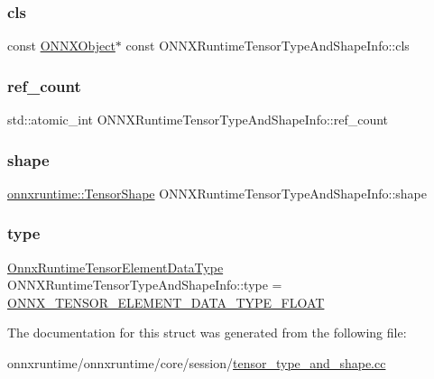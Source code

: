 \subsubsection{\texorpdfstring{cls}{cls}}
{\footnotesize\ttfamily const \mbox{\hyperlink{structONNXObject}{O\+N\+N\+X\+Object}}$\ast$ const O\+N\+N\+X\+Runtime\+Tensor\+Type\+And\+Shape\+Info\+::cls}

\mbox{\label{structONNXRuntimeTensorTypeAndShapeInfo_a365e7d1b11148a68b6a2f36c27229bcd}} 
\subsubsection{\texorpdfstring{ref\+\_\+count}{ref\_count}}
{\footnotesize\ttfamily std\+::atomic\+\_\+int O\+N\+N\+X\+Runtime\+Tensor\+Type\+And\+Shape\+Info\+::ref\+\_\+count}

\mbox{\label{structONNXRuntimeTensorTypeAndShapeInfo_af1c284a4dd9af384513521d0933ff7d7}} 
\subsubsection{\texorpdfstring{shape}{shape}}
{\footnotesize\ttfamily \mbox{\hyperlink{classonnxruntime_1_1TensorShape}{onnxruntime\+::\+Tensor\+Shape}} O\+N\+N\+X\+Runtime\+Tensor\+Type\+And\+Shape\+Info\+::shape}

\mbox{\label{structONNXRuntimeTensorTypeAndShapeInfo_acd65ed287f2c843d03618772b76a08ab}} 
\subsubsection{\texorpdfstring{type}{type}}
{\footnotesize\ttfamily \mbox{\hyperlink{tensor__type__and__shape__c__api_8h_acc48f6a9c9e4d7071352e45ce13324b3}{Onnx\+Runtime\+Tensor\+Element\+Data\+Type}} O\+N\+N\+X\+Runtime\+Tensor\+Type\+And\+Shape\+Info\+::type = \mbox{\hyperlink{tensor__type__and__shape__c__api_8h_acc48f6a9c9e4d7071352e45ce13324b3ac5b0dfee181c160755ab6d70ec09ecbc}{O\+N\+N\+X\+\_\+\+T\+E\+N\+S\+O\+R\+\_\+\+E\+L\+E\+M\+E\+N\+T\+\_\+\+D\+A\+T\+A\+\_\+\+T\+Y\+P\+E\+\_\+\+F\+L\+O\+AT}}}



The documentation for this struct was generated from the following file\+:\begin{DoxyCompactItemize}
\item 
onnxruntime/onnxruntime/core/session/\mbox{\hyperlink{tensor__type__and__shape_8cc}{tensor\+\_\+type\+\_\+and\+\_\+shape.\+cc}}\end{DoxyCompactItemize}
